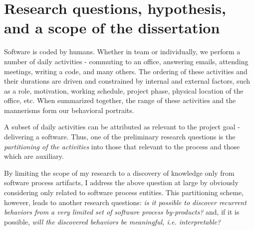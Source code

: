 
\section{Research questions, hypothesis, and a scope of the dissertation}
Software is coded by humans. Whether in team or individually, we perform a number of daily activities - 
commuting to an office, answering emails, attending meetings, writing a code, and many others. 
The ordering of these activities and their durations are driven and constrained by internal and external factors, 
such as a role, motivation, working schedule, project phase, physical location of the office, etc. 
When summarized together, the range of these activities and the mannerisms form our behavioral portraits.

A subset of daily activities can be attributed as relevant to the project goal - delivering a software. 
Thus, one of the preliminary research questions is the \textit{partitioning of the activities} into those that 
relevant to the process and those which are auxiliary. 


By limiting the scope of my research to a discovery of knowledge only from software process artifacts, 
I address the above question at large by obviously considering only related to software process entities.
This partitioning scheme, however, leads to another research questions: \textit{is it possible to discover 
recurrent behaviors from a very limited set of software process by-products?} and, if it is possible, 
\textit{will the discovered behaviors be meaningful, i.e. interpretable?}

